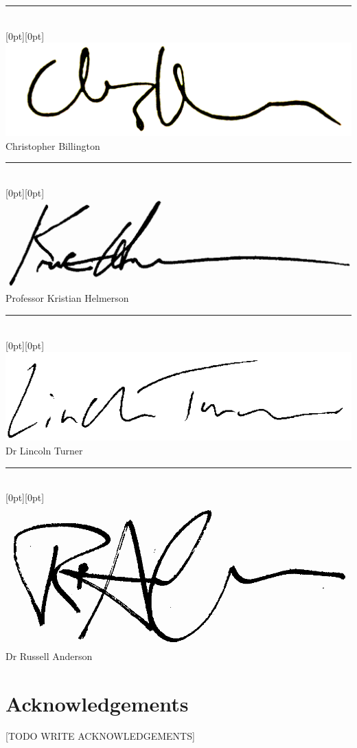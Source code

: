 \begin{center}
\vspace{1.5cm}
\rule{8cm}{1pt}\\
\raisebox{0.5cm}[0pt][0pt]{\includegraphics[scale=0.1]{submission/cjb}}\\
Christopher Billington

\vspace{1.5cm}
\rule{8cm}{1pt}\\
\raisebox{0.5cm}[0pt][0pt]{\includegraphics[scale=0.15]{submission/kh}}\\
Professor Kristian Helmerson  

\vspace{1.5cm}
\rule{8cm}{1pt}\\
\raisebox{0.6cm}[0pt][0pt]{\includegraphics[scale=0.9]{submission/ldt}}\\
Dr Lincoln Turner

\vspace{1.5cm}
\rule{8cm}{1pt}\\
\raisebox{0.5cm}[0pt][0pt]{\includegraphics[scale=0.1]{submission/rpa}}\\
Dr Russell Anderson 

\end{center}

\chapter*{Acknowledgements}

[TODO WRITE ACKNOWLEDGEMENTS]

\cleardoublepage

\tableofcontents
\cleardoublepage
{}
